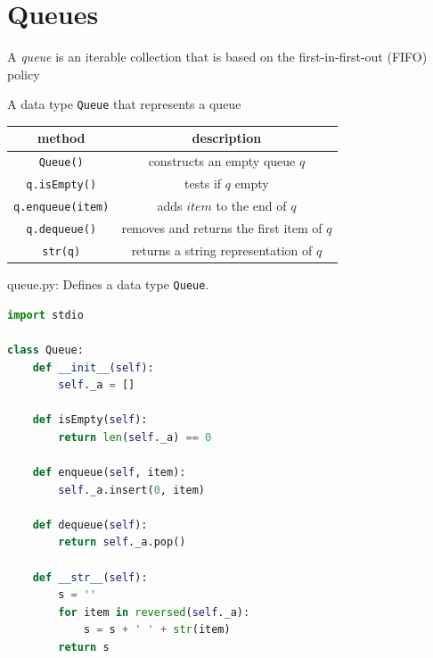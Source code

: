 \documentclass[8pt,a4paper,compress,handout]{beamer}
\begin{document}
\section{Queues}
\begin{frame}[fragile]
A \emph{queue} is an iterable collection that is based on the first-in-first-out (FIFO) policy

\bigskip

A data type \lstinline{Queue} that represents a queue
\begin{center}
\begin{tabular}{cc}
method & description \\ \hline
\lstinline$Queue()$ & constructs an empty queue $q$ \\
\lstinline$q.isEmpty()$ & tests if $q$ empty \\
\lstinline$q.enqueue(item)$ & adds $item$ to the end of $q$ \\
\lstinline$q.dequeue()$ &  removes and returns the first item of $q$ \\
\lstinline$str(q)$ & returns a string representation of $q$
\end{tabular} 
\end{center}
\end{frame}

\begin{frame}[fragile]
\begin{framed}
\tiny queue.py: Defines a data type \lstinline{Queue}.
\end{framed}

\begin{lstlisting}[language=Python]
import stdio

class Queue:
    def __init__(self):
        self._a = []

    def isEmpty(self):
        return len(self._a) == 0

    def enqueue(self, item):
        self._a.insert(0, item)

    def dequeue(self):
        return self._a.pop()

    def __str__(self):
        s = ''
        for item in reversed(self._a):
            s = s + ' ' + str(item)
        return s
\end{lstlisting}
\end{frame}
\end{document}
